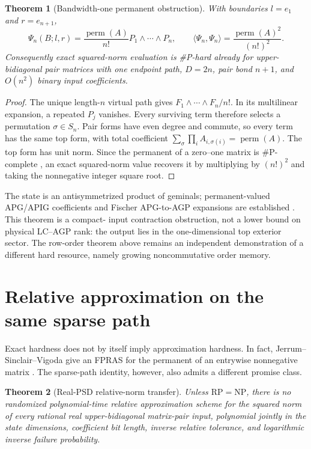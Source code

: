 \documentclass[11pt]{article}
\newtheorem{theorem}{Theorem}
\begin{document}
\begin{theorem}[Bandwidth-one permanent obstruction]
With boundaries $l=e_1$ and $r=e_{n+1}$,
\[
 \Psi_n(B;l,r)
 =\frac{\operatorname{perm}(A)}{n!}
   P_1\wedge\cdots\wedge P_n,
 \qquad
 \langle\Psi_n,\Psi_n\rangle
 =\frac{\operatorname{perm}(A)^2}{(n!)^2}.
\]
Consequently exact squared-norm evaluation is \#P-hard already for upper-
bidiagonal pair matrices with one endpoint path, $D=2n$, pair bond $n+1$,
and $O(n^2)$ binary input coefficients.
\end{theorem}

\begin{proof}
The unique length-$n$ virtual path gives
$F_1\wedge\cdots\wedge F_n/n!$. In its multilinear expansion, a repeated
$P_j$ vanishes. Every surviving term therefore selects a permutation
$\sigma\in S_n$. Pair forms have even degree and commute, so every term has
the same top form, with total coefficient
$\sum_\sigma\prod_i A_{i,\sigma(i)}=\operatorname{perm}(A)$. The top form has
unit norm. Since the permanent of a zero--one matrix is \#P-complete
\cite{Valiant1979}, an exact
squared-norm value recovers it by multiplying by $(n!)^2$ and taking the
nonnegative integer square root.
\end{proof}

The state is an antisymmetrized product of geminals; permanent-valued APG/APIG
coefficients and Fischer APG-to-AGP expansions are established
\cite{RicherKimAyers2025,KawasakiNakatani2024}. This theorem is a compact-
input contraction obstruction, not a lower bound on physical LC--AGP rank: the
output lies in the one-dimensional top exterior sector. The row-order theorem
above remains an independent demonstration of a different hard resource,
namely growing noncommutative order memory.

\section{Relative approximation on the same sparse path}

Exact hardness does not by itself imply approximation hardness. In fact,
Jerrum--Sinclair--Vigoda give an FPRAS for the permanent of an entrywise
nonnegative matrix \cite{JerrumSinclairVigoda2004}. The sparse-path identity,
however, also admits a different promise class.

\begin{theorem}[Real-PSD relative-norm transfer]
Unless $\mathrm{RP}=\mathrm{NP}$, there is no randomized polynomial-time
relative approximation scheme for the squared norm of every rational real
upper-bidiagonal matrix-pair input, polynomial jointly in the state dimensions,
coefficient bit length, inverse relative tolerance, and logarithmic inverse
failure probability.
\end{theorem}
\end{document}

